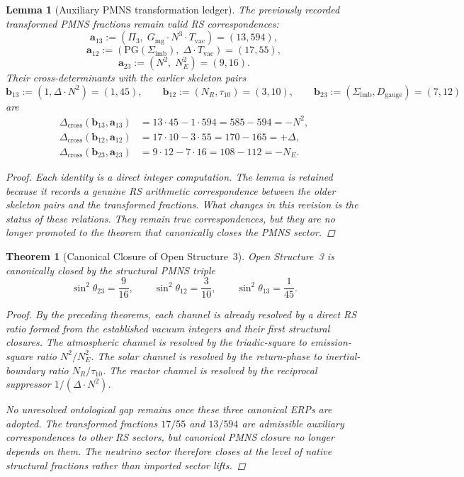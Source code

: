 \documentclass[11pt, letterpaper]{article}
\theoremstyle{definition}
\theoremstyle{plain}
\newtheorem{theorem}{Theorem}[section]
\newtheorem{lemma}{Lemma}[section]
\begin{document}
\begin{lemma}[Auxiliary PMNS transformation ledger]
The previously recorded transformed PMNS fractions remain valid RS
correspondences:
\[
\mathbf{a}_{13} := (\Pi_3,\; G_{\mathrm{mg}} \cdot N^3 \cdot T_{\mathrm{vac}})
= (13,594),
\]
\[
\mathbf{a}_{12} := (\mathrm{PG}(\Sigma_{\mathrm{imb}}),\; \Delta \cdot T_{\mathrm{vac}})
= (17,55),
\]
\[
\mathbf{a}_{23} := (N^2,\; N_E^2) = (9,16).
\]
Their cross-determinants with the earlier skeleton pairs
\[
\mathbf{b}_{13} := (1,\Delta \cdot N^2) = (1,45), \qquad
\mathbf{b}_{12} := (N_R,\tau_{10}) = (3,10), \qquad
\mathbf{b}_{23} := (\Sigma_{\mathrm{imb}}, D_{\mathrm{gauge}}) = (7,12)
\]
are
\begin{align}
\Delta_{\mathrm{cross}}(\mathbf{b}_{13},\mathbf{a}_{13})
&= 13 \cdot 45 - 1 \cdot 594 = 585 - 594 = -N^2, \label{eq:cd13}\\
\Delta_{\mathrm{cross}}(\mathbf{b}_{12},\mathbf{a}_{12})
&= 17 \cdot 10 - 3 \cdot 55 = 170 - 165 = +\Delta, \label{eq:cd12}\\
\Delta_{\mathrm{cross}}(\mathbf{b}_{23},\mathbf{a}_{23})
&= 9 \cdot 12 - 7 \cdot 16 = 108 - 112 = -N_E. \label{eq:cd23}
\end{align}

\begin{proof}
Each identity is a direct integer computation. The lemma is retained because
it records a genuine RS arithmetic correspondence between the older skeleton
pairs and the transformed fractions. What changes in this revision is the
status of these relations. They remain true correspondences, but they are no
longer promoted to the theorem that canonically closes the PMNS sector.
\end{proof}
\end{lemma}

\begin{theorem}[Canonical Closure of Open Structure~3]
Open Structure~3 is canonically closed by the structural PMNS triple
\[
\sin^2\theta_{23} = \frac{9}{16}, \qquad
\sin^2\theta_{12} = \frac{3}{10}, \qquad
\sin^2\theta_{13} = \frac{1}{45}.
\]

\begin{proof}
By the preceding theorems, each channel is already resolved by a direct RS
ratio formed from the established vacuum integers and their first structural
closures. The atmospheric channel is resolved by the triadic-square to
emission-square ratio $N^2/N_E^2$. The solar channel is resolved by the
return-phase to inertial-boundary ratio $N_R/\tau_{10}$. The reactor channel
is resolved by the reciprocal suppressor $1/(\Delta \cdot N^2)$.

No unresolved ontological gap remains once these three canonical ERPs are
adopted. The transformed fractions $17/55$ and $13/594$ are admissible
auxiliary correspondences to other RS sectors, but canonical PMNS closure no
longer depends on them. The neutrino sector therefore closes at the level of
native structural fractions rather than imported sector lifts.
\end{proof}
\end{theorem}
\end{document}
